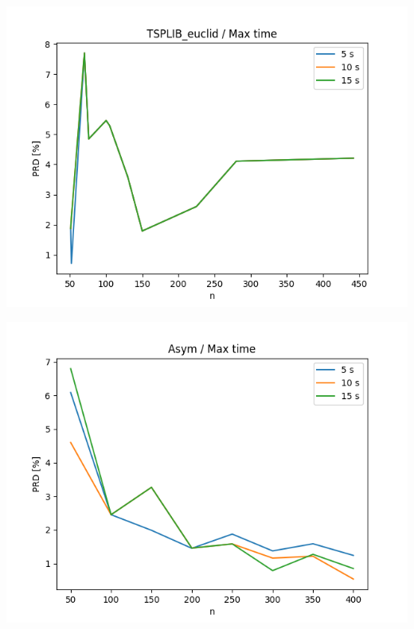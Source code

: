 \documentclass{article}
\begin{document}
\begin{center}
\includegraphics[width=\textwidth, 
                   height = 0.4\textheight, 
                   keepaspectratio]
                  {plots/tsplib_euclid_9_max_time} 
\end{center}

\begin{center}
\includegraphics[width=\textwidth, 
                   height = 0.4\textheight, 
                   keepaspectratio]
                  {plots/asym_9_max_time} 
\end{center}
\end{document}
